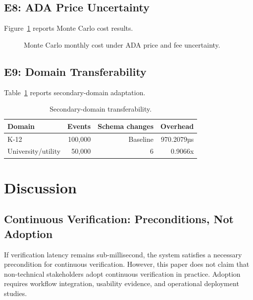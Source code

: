 \documentclass[journal]{IEEEtran}
\begin{document}
\subsection{E8: ADA Price Uncertainty}
Figure~\ref{fig:montecarlo} reports Monte Carlo cost results.

\begin{figure}[!t]
\centering
{}
\caption{Monte Carlo monthly cost under ADA price and fee uncertainty.}
\label{fig:montecarlo}
\end{figure}

\subsection{E9: Domain Transferability}
Table~\ref{tab:domain} reports secondary-domain adaptation.

\begin{table}[!t]
\centering
\caption{Secondary-domain transferability.}
\label{tab:domain}
\small
\begin{tabular}{@{}l r r r@{}}
\toprule
Domain & Events & Schema changes & Overhead \\
\midrule
K-12 & 100{,}000 & Baseline & 970.2079µs \\
University/utility & 50{,}000 & 6 & 0.9066x \\
\bottomrule
\end{tabular}
\end{table}

\section{Discussion}
\label{sec:discussion}

\subsection{Continuous Verification: Preconditions, Not Adoption}
If verification latency remains sub-millisecond, the system satisfies a necessary precondition for continuous verification. However, this paper does not claim that non-technical stakeholders adopt continuous verification in practice. Adoption requires workflow integration, usability evidence, and operational deployment studies.
\end{document}
